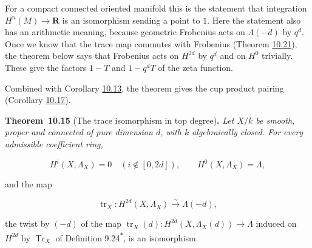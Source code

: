 \documentclass[11pt]{article}
\newenvironment{bpstatement}[2]{\par\addvspace{0.6\baselineskip}\noindent\textbf{#1}#2\textbf{.}\enspace\ignorespaces}
  {\par\addvspace{0.4\baselineskip}}
\newenvironment{bpstatementit}[2]{\begin{bpstatement}{#1}{#2}\itshape\ignorespaces}{\end{bpstatement}}
\newcommand{\bpout}[1]{#1\textsuperscript{\hyperlink{bp-outside}{\ensuremath{\ast}}}}
\begin{document}
For a compact connected oriented manifold this is the statement that integration \(H^n(M)\to\mathbf R\) is an isomorphism sending a point to \(1\). Here the statement also has an arithmetic meaning, because geometric Frobenius acts on \(\Lambda(-d)\) by \(q^d\). Once we know that the trace map commutes with Frobenius (Theorem \hyperref[bp65]{10.21}), the theorem below says that Frobenius acts on \(H^{2d}\) by \(q^d\) and on \(H^0\) trivially. These give the factors \(1-T\) and \(1-q^dT\) of the zeta function.

Combined with Corollary \hyperref[bp40]{10.13}, the theorem gives the cup product pairing (Corollary \hyperref[bp52]{10.17}).

\label{bp46}%
\begin{bpstatementit}{Theorem~10.15}{ (The trace isomorphism in top degree)}
Let \(X/k\) be smooth, proper and connected of pure dimension \(d\), with \(k\) algebraically closed. For every admissible coefficient ring,

\[
H^i(X,\Lambda_X)=0\quad(i\notin[0,2d]),\qquad
H^0(X,\Lambda_X)=\Lambda,
\]

and the map

\[
\operatorname{tr}_X:H^{2d}(X,\Lambda_X)
\xrightarrow{\sim}\Lambda(-d),
\]

the twist by \((-d)\) of the map \(\operatorname{tr}_X(d):H^{2d}(X,\Lambda_X(d))\to\Lambda\) induced on \(H^{2d}\) by \(\operatorname{Tr}_X\) of Definition \bpout{9.24}, is an isomorphism.
\end{bpstatementit}
\end{document}
